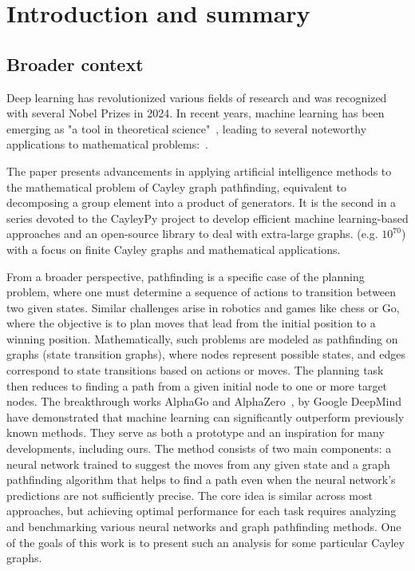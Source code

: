 \documentclass[atmp]{ipart_v1}
\numberwithin{equation}{section}
\theoremstyle{plain}%
\begin{document}
\maketitle


\section{Introduction and summary}
\subsection{Broader context}
Deep learning has revolutionized various fields of research and was recognized with several Nobel Prizes in 2024.  
In recent years, machine learning has been emerging as "a tool in theoretical science"~\cite{douglas2022machine}, leading to several noteworthy applications to mathematical problems:~\cite{lample2019deep,davies2021advancing, bao2021polytopes, 
romera2024mathematical,
coates2024machine,alfarano2024global, charton2024patternboost,shehper2024makes,swirszcz2025advancing}.
 
The paper presents advancements in applying artificial intelligence methods to the mathematical problem of Cayley graph pathfinding, equivalent to decomposing a group element into a product of generators. It is the second in a series devoted to the CayleyPy project to develop efficient machine learning-based approaches and an open-source library to deal with extra-large graphs.
(e.g. $10^{70}$) with a focus on finite Cayley graphs and mathematical applications.

From a broader perspective, pathfinding is a specific case of the planning problem, where one must determine a sequence of actions to transition between two given states. Similar challenges arise in robotics and games like chess or Go, where the objective is to plan moves that lead from the initial position to a winning position. Mathematically, such problems are modeled as pathfinding on graphs (state transition graphs), where nodes represent possible states, and edges correspond to state transitions based on actions or moves. The planning task then reduces to finding a path from a given initial node to one or more target nodes. The breakthrough works AlphaGo and AlphaZero~\cite{silver2016mastering}, \cite{silver2017mastering} by Google DeepMind have demonstrated that machine learning can significantly outperform previously known methods. They serve as both a prototype and an inspiration for many developments, including ours. The method consists of two main components: a neural network trained to suggest the moves from any given state and a graph pathfinding algorithm that helps to find a path even when the neural network's predictions are not sufficiently precise. The core idea is similar across most approaches, but achieving optimal performance for each task requires analyzing and benchmarking various neural networks and graph pathfinding methods. One of the goals of this work is to present such an analysis for some particular Cayley graphs.
\end{document}
